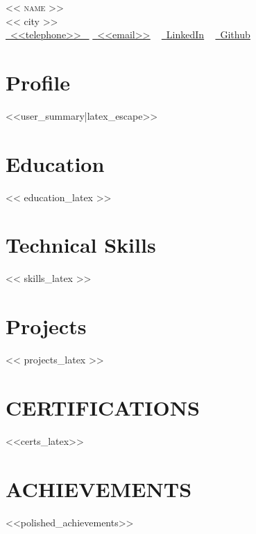 \documentclass[letterpaper,11pt]{article}
\begin{document}
\begin{center}
    {\Huge \scshape << name >>} \\ \vspace{1pt}
    << city >> \\ \vspace{3pt}
    \small 
    \small \href{<<telephone>>}{ \raisebox{-0.1\height}\faPhone\ \underline{<<telephone>>} ~} 
    \href{<<email>>}{\raisebox{-0.2\height}\faEnvelope\  \underline{<<email>>}} ~
    \href{<<linkedin>>}{\raisebox{-0.2\height}\faLinkedinSquare\ \underline{LinkedIn}}  ~
    \href{<<github>>}{\raisebox{-0.2\height}\faGithub\ \underline{Github}} ~
\end{center}

\section{Profile}
<<user_summary|latex_escape>>

\section*{Education}
<< education_latex >>

\section*{Technical Skills}
<< skills_latex >>

\section*{Projects}
<< projects_latex >>

\section{CERTIFICATIONS}
<<certs_latex>>

\section{ACHIEVEMENTS}
<<polished_achievements>>
\end{document}
